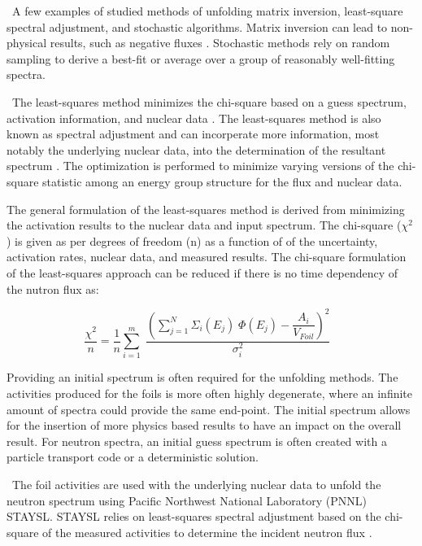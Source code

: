 \documentclass[journal]{IEEEtran}
\begin{document}
	\ A few examples of studied methods of unfolding matrix inversion, least-square spectral adjustment, and stochastic algorithms\cite{Reginatto2010}. Matrix inversion can lead to non-physical results, such as negative fluxes \cite{Reginatto2010}. Stochastic methods rely on random sampling to derive a best-fit or average over a group of reasonably well-fitting spectra\cite{Reginatto2010}. 
	
	\ The least-squares method minimizes the chi-square based on a guess spectrum, activation information, and nuclear data \cite{Perey1977}. The least-squares method is also known as spectral adjustment and can incorperate more information, most notably the underlying nuclear data, into the determination of the resultant spectrum \cite{Perey1977}. The optimization is performed to minimize varying versions of the chi-square statistic among an energy group structure for the flux and nuclear data. 
	
	The general formulation of the least-squares method is derived from minimizing the activation results to the nuclear data and input spectrum\cite{Perey1977}. The chi-square ($\chi^{2}$) is given as per degrees of freedom (n) as a function of of the uncertainty, activation rates, nuclear data, and measured results. The chi-square formulation of the least-squares approach can be reduced if there is no time dependency of the nutron flux as:
	
	\begin{equation} \label{eq:LeastSq}
	\dfrac{\chi^2}{n}= \dfrac{1}{n}\sum_{i=1}^{m} \; \dfrac{(\sum_{j=1}^{N} \Sigma_{i}(E_{j}) \;\Phi(E_{j})-\dfrac{A_{i}}{V_{Foil}})^{2}}{\sigma_{i}^{2}} \,\;\; 
	\end{equation}
	
	Providing an initial spectrum is often required for the unfolding methods. The activities produced for the foils is more often highly degenerate, where an infinite amount of spectra could provide the same end-point. The initial spectrum allows for the insertion of more physics based results to have an impact on the overall result. For neutron spectra, an initial guess spectrum is often created with a particle transport code or a deterministic solution. 

	\ The foil activities are used with the underlying nuclear data to unfold the neutron spectrum using Pacific Northwest National Laboratory (PNNL) STAYSL. STAYSL relies on least-squares spectral adjustment based on the chi-square of the measured activities to determine the incident neutron flux \cite{Greenwood2016}. 
	
\end{document}
